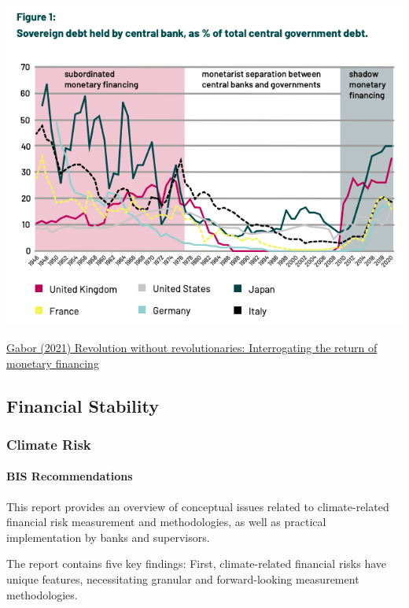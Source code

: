 \documentclass[
]{book}
\begin{document}
\includegraphics{fig/sovereign_debt_held_by_central_banks.png}

\href{https://transformative-responses.org/the-project/next-generation-central-banking-climate-change-inequality-financial-instability/}{Gabor (2021) Revolution without revolutionaries: Interrogating the return of monetary financing}

\hypertarget{financial-stability}{%
\subsection{Financial Stability}\label{financial-stability}}

\hypertarget{climate-risk}{%
\subsubsection{Climate Risk}\label{climate-risk}}

\hypertarget{bis-recommendations}{%
\paragraph{BIS Recommendations}\label{bis-recommendations}}

This report provides an overview of conceptual issues related to climate-related financial risk
measurement and methodologies, as well as practical implementation by banks and supervisors.

The report contains five key findings:
First, climate-related financial risks have unique features, necessitating granular and
forward-looking measurement methodologies.
\end{document}
